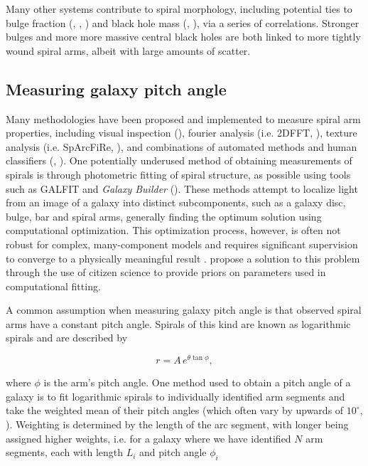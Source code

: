 Many other systems contribute to spiral morphology, including potential ties to bulge fraction (\citealt{1975A&A....44..363Y}, \citealt{2013MNRAS.436.1074S}, \citealt{2019MNRAS.487.1808M}) and black hole mass (\citealt{2015PhDT........14D}, \citealt{2017MNRAS.471.2187D}), via a series of correlations. Stronger bulges and more more massive central black holes are both linked to more tightly wound spiral arms, albeit with large amounts of scatter.


\subsection{Measuring galaxy pitch angle}

Many methodologies have been proposed and implemented to measure spiral arm properties, including visual inspection (\citealt{2015A&A...582A..86H}), fourier analysis (i.e. \textsc{2DFFT}, \citealt{2012ApJS..199...33D}), texture analysis (i.e. SpArcFiRe, \citealt{2014ApJ...790...87D}), and combinations of automated methods and human classifiers (\citealt{2017MNRAS.472.2263H}, \citealt{2020MNRAS.493.3854H}). One potentially underused method of obtaining measurements of spirals is through photometric fitting of spiral structure, as possible using tools such as \textsc{GALFIT} \citep{2010AJ....139.2097P} and \textit{Galaxy Builder} (\Lingard). These methods attempt to localize light from an image of a galaxy into distinct subcomponents, such as a galaxy disc, bulge, bar and spiral arms, generally finding the optimum solution using computational optimization. This optimization process, however, is often not robust for complex, many-component models and requires significant supervision to converge to a physically meaningful result \citep{Gao2017:1709.00746v1}. \Lingard propose a solution to this problem through the use of citizen science to provide priors on parameters used in computational fitting.

A common assumption when measuring galaxy pitch angle is that observed spiral arms have a constant pitch angle. Spirals of this kind are known as logarithmic spirals and are described by

\begin{equation}
r = A\,e^{\theta\tan\phi},
\end{equation}

where $\phi$ is the arm's pitch angle. One method used to obtain a pitch angle of a galaxy is to fit logarithmic spirals to individually identified arm segments and take the weighted mean of their pitch angles (which often vary by upwards of $10^\circ$, \citealt{2014ApJ...790...87D}). Weighting is determined by the length of the arc segment, with longer being assigned higher weights, i.e. for a galaxy where we have identified $N$ arm segments, each with length $L_i$ and pitch angle $\phi_i$

